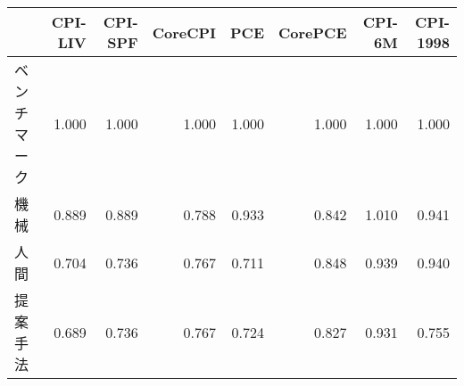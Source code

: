 \begin{tabular}{lrrrrrrr}
\toprule
{} &  CPI-LIV &  CPI-SPF &  CoreCPI &    PCE &  CorePCE &  CPI-6M &  CPI-1998 \\
\midrule
ベンチマーク&    1.000 &    1.000 &    1.000 &  1.000 &    1.000 &   1.000 &     1.000 \\
機械      &    0.889 &    0.889 &    0.788 &  0.933 &    0.842 &   1.010 &     0.941 \\
人間      &    0.704 &\alert{0.736}&\alert{0.767}&\alert{0.711}&    0.848 &   0.939 &     0.940 \\
提案手法   &\alert{0.689}&\alert{0.736}&\alert{0.767}&  0.724 &\alert{0.827}&\alert{0.931} &\alert{0.755} \\
\bottomrule
\end{tabular}
